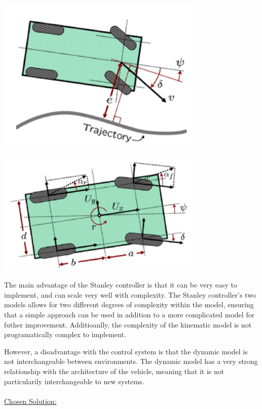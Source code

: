 \documentclass[titlepage]{article}
\begin{document}
\begin{center}
	\includegraphics[width=4in]{stanley_kinematic.PNG}\\
	 \label{fig:stankine}
\end{center}

\begin{center}
	\includegraphics[width=4in]{stanley_dynamic.PNG}\\
	 \label{fig:standyna}
\end{center}

The main advantage of the Stanley controller is that it can be very easy to implement, and can scale very well with complexity. The Stanley controller's two models allows for two different degrees of complexity within the model, ensuring that a simple approach can be used in addition to a more complicated model for futher improvement. Additioanlly, the complexity of the kinematic model is not programatically complex to implement. 

However, a disadvantage with the control system is that the dynamic model is not interchangeable between environments. The dynamic model has a very strong relationship with the architecture of the vehicle, meaning that it is not particularily interchangeable to new systems. \\~\\
\underline{Chosen Solution:}
\end{document}
